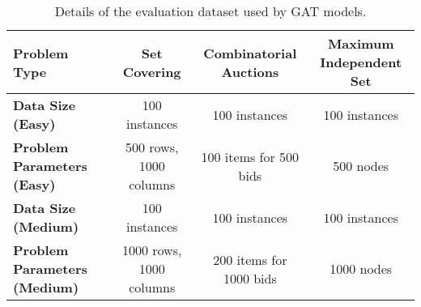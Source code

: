 \begin{table*}[htb!]
    \centering
    \begin{tabular}{|l c c c|}
        \hline
        \textbf{Problem Type} & \textbf{Set Covering} & \textbf{Combinatorial Auctions} & \textbf{Maximum Independent Set}\\
        \hline
        \textbf{Data Size (Easy)} & 100 instances & 100 instances & 100 instances\\
        \textbf{Problem Parameters (Easy)} & 500 rows, 1000 columns & 100 items for 500 bids & 500 nodes\\
        \textbf{Data Size (Medium)} & 100 instances & 100 instances & 100 instances\\
        \textbf{Problem Parameters (Medium)} & 1000 rows, 1000 columns & 200 items for 1000 bids & 1000 nodes\\
        \hline
    \end{tabular}
    \caption{Details of the evaluation dataset used by GAT models.}
    \label{tab:gat-evaluation-data}
\end{table*}
